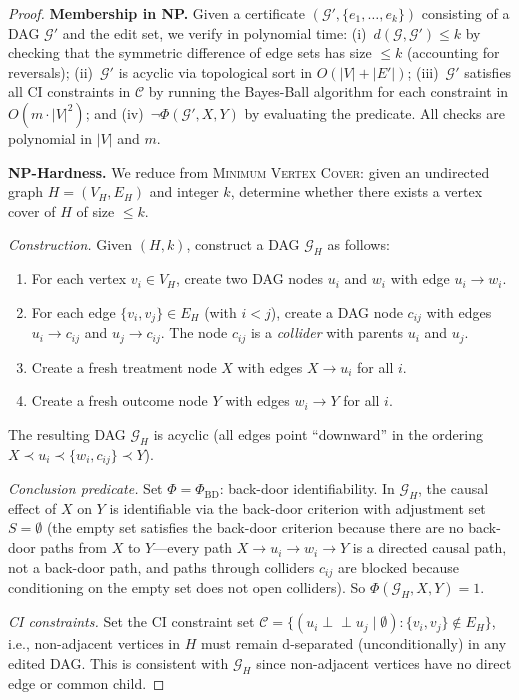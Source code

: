 \documentclass[11pt,a4paper]{article}
\theoremstyle{definition}
\theoremstyle{remark}
\newcommand{\CI}{\perp\!\!\!\perp}
\newcommand{\DAG}{\mathcal{G}}
\newcommand{\editdist}{d}
\newcommand{\Phi}{\varPhi}
\begin{document}
\begin{proof}
\textbf{Membership in NP.} Given a certificate $(\DAG', \{e_1, \ldots, e_k\})$
consisting of a DAG $\DAG'$ and the edit set, we verify in polynomial time:
(i)~$\editdist(\DAG, \DAG') \leq k$ by checking that the symmetric difference of edge
sets has size $\leq k$ (accounting for reversals); (ii)~$\DAG'$ is acyclic via
topological sort in $O(|V| + |E'|)$; (iii)~$\DAG'$ satisfies all CI constraints in
$\mathcal{C}$ by running the Bayes-Ball algorithm for each constraint in
$O(m \cdot |V|^2)$; and (iv)~$\neg\Phi(\DAG', X, Y)$ by evaluating the predicate.
All checks are polynomial in $|V|$ and $m$.

\textbf{NP-Hardness.} We reduce from \textsc{Minimum Vertex Cover}: given an
undirected graph $H = (V_H, E_H)$ and integer $k$, determine whether there exists a
vertex cover of $H$ of size $\leq k$.

\medskip
\noindent\textit{Construction.} Given $(H, k)$, construct a DAG $\DAG_H$ as follows:
\begin{enumerate}
  \item For each vertex $v_i \in V_H$, create two DAG nodes $u_i$ and $w_i$ with edge
    $u_i \to w_i$.
  \item For each edge $\{v_i, v_j\} \in E_H$ (with $i < j$), create a DAG node $c_{ij}$
    with edges $u_i \to c_{ij}$ and $u_j \to c_{ij}$. The node $c_{ij}$ is a
    \emph{collider} with parents $u_i$ and $u_j$.
  \item Create a fresh treatment node $X$ with edges $X \to u_i$ for all $i$.
  \item Create a fresh outcome node $Y$ with edges $w_i \to Y$ for all $i$.
\end{enumerate}

The resulting DAG $\DAG_H$ is acyclic (all edges point ``downward'' in the ordering
$X \prec u_i \prec \{w_i, c_{ij}\} \prec Y$).

\medskip
\noindent\textit{Conclusion predicate.} Set $\Phi = \Phi_{\mathrm{BD}}$: back-door
identifiability. In $\DAG_H$, the causal effect of $X$ on $Y$ is identifiable via the
back-door criterion with adjustment set $S = \emptyset$ (the empty set satisfies the
back-door criterion because there are no back-door paths from $X$ to $Y$---every path
$X \to u_i \to w_i \to Y$ is a directed causal path, not a back-door path, and paths
through colliders $c_{ij}$ are blocked because conditioning on the empty set does not
open colliders). So $\Phi(\DAG_H, X, Y) = 1$.

\medskip
\noindent\textit{CI constraints.} Set the CI constraint set
$\mathcal{C} = \{(u_i \CI u_j \mid \emptyset) : \{v_i, v_j\} \notin E_H\}$, i.e.,
non-adjacent vertices in $H$ must remain d-separated (unconditionally) in any edited
DAG. This is consistent with $\DAG_H$ since non-adjacent vertices have no direct edge
or common child.


\end{proof}
\end{document}
